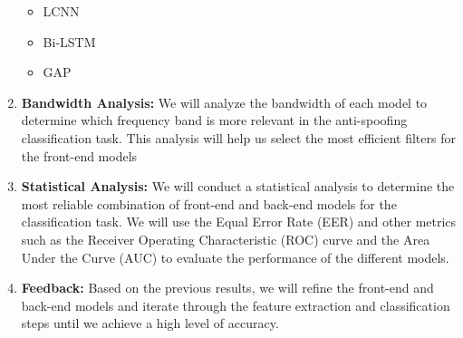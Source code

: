\begin{enumerate}
    \begin{itemize}
        \item \ac{LCNN}
        \item \ac{Bi-LSTM}
        \item \ac{GAP}
    \end{itemize}
    \item \textbf{Bandwidth Analysis:} We will analyze the bandwidth of each model to determine which frequency band is more relevant in the anti-spoofing classification task. This analysis will help us select the most efficient filters for the front-end models
    \item \textbf{Statistical Analysis:} We will conduct a statistical analysis to determine the most reliable combination of front-end and back-end models for the classification task. We will use the Equal Error Rate (EER) and other metrics such as the Receiver Operating Characteristic (ROC) curve and the Area Under the Curve (AUC) to evaluate the performance of the different models.
    \item \textbf{Feedback:} Based on the previous results, we will refine the front-end and back-end models and iterate through the feature extraction and classification steps until we achieve a high level of accuracy.
\end{enumerate}



\endinput
